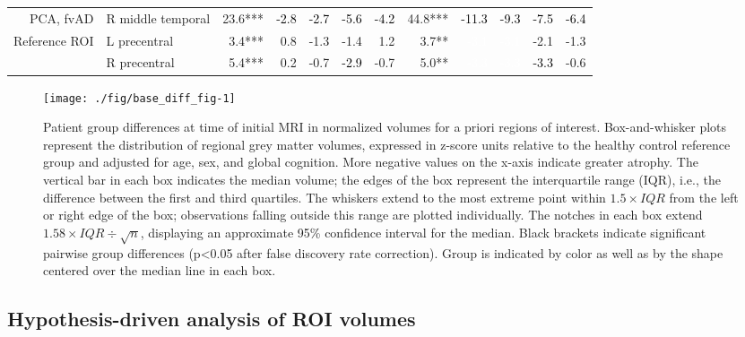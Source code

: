 \documentclass[]{article}
\begin{document}
\begin{table}[ht]
{\begin{tabular}{rlrrrrrrrrrr}
  PCA, fvAD & R middle temporal & 23.6*** & \cellcolor{green}\textcolor{black}{-2.8} & \cellcolor{green}\textcolor{black}{-2.7} & \cellcolor{green}\textcolor{black}{-5.6} & \cellcolor{green}\textcolor{black}{-4.2} & 44.8*** & \cellcolor{green}\textcolor{black}{-11.3} & \cellcolor{green}\textcolor{black}{-9.3} & \cellcolor{green}\textcolor{black}{-7.5} & \cellcolor{green}\textcolor{black}{-6.4} \\ 
  Reference ROI & L precentral & 3.4*** & 0.8 & -1.3 & -1.4 & 1.2 & 3.7** & \cellcolor{red}\textcolor{white}{-3.1} & \cellcolor{red}\textcolor{white}{-3.1} & -2.1 & -1.3 \\ 
   & R precentral & 5.4*** & 0.2 & -0.7 & \cellcolor{green}\textcolor{black}{-2.9} & -0.7 & 5.0** & \cellcolor{red}\textcolor{white}{-3.3} & \cellcolor{red}\textcolor{white}{-3.3} & \cellcolor{green}\textcolor{black}{-3.3} & -0.6 \\ 
   \hline
\end{tabular}
}
\end{table}

\begin{figure}

{\centering \texttt{[image: ./fig/base\_diff\_fig-1]} 

}

\caption{Patient group differences at time of initial MRI in normalized volumes for a priori regions of interest. Box-and-whisker plots represent the distribution of regional grey matter volumes, expressed in z-score units relative to the healthy control reference group and adjusted for age, sex, and global cognition. More negative values on the x-axis indicate greater atrophy. The vertical bar in each box indicates the median volume; the edges of the box represent the interquartile range (IQR), i.e., the difference between the first and third quartiles. The whiskers extend to the most extreme point within $1.5\times IQR$ from the left or right edge of the box; observations falling outside this range are plotted individually. The notches in each box extend $1.58\times IQR\div{\sqrt{n}}$, displaying an approximate 95\% confidence interval for the median. Black brackets indicate significant pairwise group differences (p<0.05 after false discovery rate correction). Group is indicated by color as well as by the shape centered over the median line in each box.}\label{fig:base_diff_fig}
\end{figure}

\subsection*{Hypothesis-driven analysis of ROI
volumes}\label{hypothesis-driven-analysis-of-roi-volumes}
\end{document}
